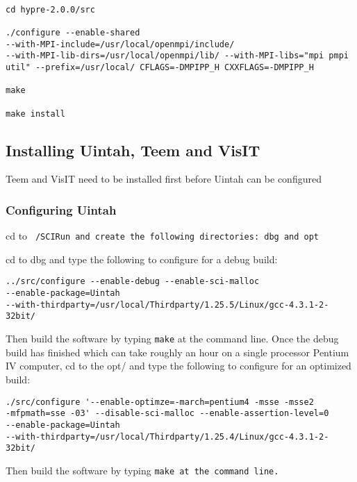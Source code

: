 \begin{verbatim}

cd hypre-2.0.0/src

./configure --enable-shared
--with-MPI-include=/usr/local/openmpi/include/
--with-MPI-lib-dirs=/usr/local/openmpi/lib/ --with-MPI-libs="mpi pmpi
util" --prefix=/usr/local/ CFLAGS=-DMPIPP_H CXXFLAGS=-DMPIPP_H

make

make install

\end{verbatim}

 

\subsection{Installing Uintah, Teem and VisIT}

Teem and VisIT need to be installed first before Uintah can be configured 




\subsubsection{Configuring Uintah}

cd to \tt ~/SCIRun \normalfont and create the following directories: dbg and opt

cd to dbg and type the following to configure for a debug build:

\begin{Verbatim}[fontsize=\footnotesize]
../src/configure --enable-debug --enable-sci-malloc 
--enable-package=Uintah 
--with-thirdparty=/usr/local/Thirdparty/1.25.5/Linux/gcc-4.3.1-2-32bit/
\end{Verbatim}

Then build the software by typing \texttt{make} at the command
line. Once the debug build has finished which can take roughly an hour
on a single processor Pentium IV computer, cd to the opt/ and type the
following to configure for an optimized build:

\begin{Verbatim}[fontsize=\footnotesize]
./src/configure '--enable-optimze=-march=pentium4 -msse -msse2 
-mfpmath=sse -03' --disable-sci-malloc --enable-assertion-level=0 
--enable-package=Uintah 
--with-thirdparty=/usr/local/Thirdparty/1.25.4/Linux/gcc-4.3.1-2-32bit/
\end{Verbatim}

Then build the software by typing \tt make \normalfont at the command line.

